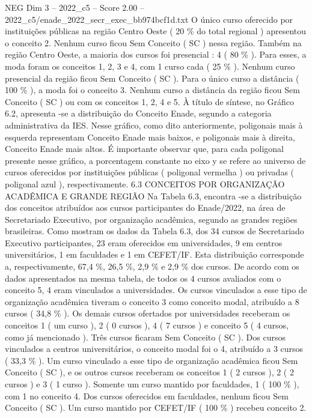 \begin{textsample}{NEG Dim 3 – 2022\_c5 – Score 2.00 – 2022\_c5/enade\_2022\_secr\_exec\_bb974bcf1d.txt}
O único curso oferecido por instituições públicas na região Centro Oeste ( 20 \% do total regional ) apresentou o conceito 2.
Nenhum curso ficou Sem Conceito ( SC ) nessa região.
Também na região Centro Oeste, a maioria dos cursos foi presencial : 4 ( 80 \% ).
Para esses, a moda foram os conceitos 1, 2, 3 e 4, com 1 curso cada ( 25 \% ).
Nenhum curso presencial da região ficou Sem Conceito ( SC ).
Para o único curso a distância ( 100 \% ), a moda foi o conceito 3.
Nenhum curso a distância da região ficou Sem Conceito ( SC ) ou com os conceitos 1, 2, 4 e 5.
À título de síntese, no Gráfico 6.2, apresenta -se a distribuição do Conceito Enade, segundo a categoria administrativa da IES.
Nesse gráfico, como dito anteriormente, poligonais mais à esquerda representam Conceito Enade mais baixos, e poligonais mais à direita, Conceito Enade mais altos.
É importante observar que, para cada poligonal presente nesse gráfico, a porcentagem constante no eixo y se refere ao universo de cursos oferecidos por instituições públicas ( poligonal vermelha ) ou privadas ( poligonal azul ), respectivamente. 6.3 CONCEITOS POR ORGANIZAÇÃO ACADÊMICA E GRANDE REGIÃO Na Tabela 6.3, encontra -se a distribuição dos conceitos atribuídos aos cursos participantes do Enade/2022, na área de Secretariado Executivo, por organização acadêmica, segundo as grandes regiões brasileiras.
Como mostram os dados da Tabela 6.3, dos 34 cursos de Secretariado Executivo participantes, 23 eram oferecidos em universidades, 9 em centros universitários, 1 em faculdades e 1 em CEFET/IF.
Esta distribuição corresponde a, respectivamente, 67,4 \%, 26,5 \%, 2,9 \% e 2,9 \% dos cursos.
De acordo com os dados apresentados na mesma tabela, de todos os 4 cursos avaliados com o conceito 5, 4 eram vinculados a universidades.
Os cursos vinculados a esse tipo de organização acadêmica tiveram o conceito 3 como conceito modal, atribuído a 8 cursos ( 34,8 \% ).
Os demais cursos ofertados por universidades receberam os conceitos 1 ( um curso ), 2 ( 0 cursos ), 4 ( 7 cursos ) e conceito 5 ( 4 cursos, como já mencionado ).
Três cursos ficaram Sem Conceito ( SC ).
Dos cursos vinculados a centros universitários, o conceito modal foi o 4, atribuído a 3 cursos ( 33,3 \% ).
Um curso vinculado a esse tipo de organização acadêmica ficou Sem Conceito ( SC ), e os outros cursos receberam os conceitos 1 ( 2 cursos ), 2 ( 2 cursos ) e 3 ( 1 curso ).
Somente um curso mantido por faculdades, 1 ( 100 \% ), com 1 no conceito 4.
Dos cursos oferecidos em faculdades, nenhum ficou Sem Conceito ( SC ).
Um curso mantido por CEFET/IF ( 100 \% ) recebeu conceito 2.

\end{textsample}
